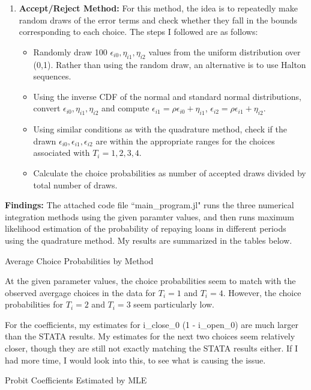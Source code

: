 \documentclass[12pt]{article}
\begin{document}
\begin{enumerate}
	\item \textbf{Accept/Reject Method: } For this method, the idea is to repeatedly make random draws of the error terms and check whether they fall in the bounds corresponding to each choice. The steps I followed are as follows:
		\begin{itemize}
			\item Randomly draw 100 $\epsilon_{i0}, \eta_{i1}, \eta_{i2}$ values from the uniform distribution over (0,1). Rather than using the random draw, an alternative is to use Halton sequences.
			\item Using the inverse CDF of the normal and standard normal distributions, convert $\epsilon_{i0}, \eta_{i1}, \eta_{i2}$ and compute $\epsilon_{i1} = \rho \epsilon_{i0} + \eta_{i1}$, $\epsilon_{i2} = \rho \epsilon_{i1} + \eta_{i2}$.
			\item Using similar conditions as with the quadrature method, check if the drawn $\epsilon_{i0}, \epsilon_{i1}, \epsilon_{i2}$ are within the appropriate ranges for the choices associated with $T_i = 1, 2, 3, 4$.
			\item Calculate the choice probabilities as number of accepted draws divided by total number of draws.	
		\end{itemize}
	\end{enumerate}

\noindent \textbf{Findings:} The attached code file ``main\_program.jl" runs the three numerical integration methods using the given paramter values, and then runs maximum likelihood estimation of the probability of repaying loans in different periods using the quadrature method. My results are summarized in the tables below. 

\begin{table}[!htbp]
\centering 
\caption{Average Choice Probabilities by Method}\label{tab_prob}

\end{table}

\FloatBarrier
\noindent At the given parameter values, the choice probabilities seem to match with the observed avergage choices in the data for $T_i = 1$ and $T_i = 4$. However, the choice probabilities for $T_i=2$ and $T_i = 3$ seem particularly low.  

\clearpage 
For the coefficients, my estimates for i\_close\_0 (1 - i\_open\_0) are much larger than the STATA results. My estimates for the next two choices seem relatively closer, though they are still not exactly matching the STATA results either. If I had more time, I would look into this, to see what is causing the issue.
\begin{table}[!htbp]
	\centering 
	\caption{Probit Coefficients Estimated by MLE}\label{tab_mle}
	
\end{table}
\end{document}
